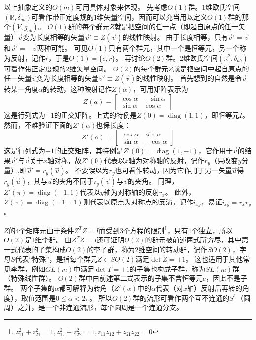 以上抽象定义的$O(m)$可用具体对象来体现。
先考虑$O(1)$群。$1$维欧氏空间$(\mathbb{R}, \delta_{ab})$可看作带正定度规的$1$维矢量空间，因而可以充当用以定义$O(1)$群的那个$(V, g_{ab})$。
$O(1)$群的每个群元$Z$就是把空间的任一点（即起自原点的任一矢量）$\vec v$变为长度相等的矢量$\vec v' \equiv Z(\vec v)$的线性映射。
由于长度相等，只有$\vec v' = \vec v$和$\vec v' = -\vec v$两种可能。
可见$O(1)$只有两个群元，其中一个是恒等元，另一个称为反射，记作$r$，于是$O(1) = \{e, r\}$。
再讨论$O(2)$群。$2$维欧氏空间$(\mathbb{R}^2, \delta_{ab})$可看作带正定度规的$2$维矢量空间。
$O(2)$的每个群元$Z$就是把空间中起自原点的任一矢量$\vec v$变为长度相等的矢量$\vec v' \equiv Z(\vec v)$的线性映射。
首先想到的自然是令$\vec v$转某一角度$\alpha$的转动，这种映射记作$Z(\alpha)$，可用矩阵表示为
$$Z(\alpha) = \begin{bmatrix}
    \cos \alpha & -\sin \alpha \\
    \sin \alpha & \cos \alpha
\end{bmatrix}$$
这是行列式为$+1$的正交矩阵。上式的特例是$Z(0) = \operatorname{diag}(1, 1)$，即恒等元$I$。
然而，不难验证下面的$Z'(\alpha)$也保长度：
$$Z'(\alpha) = \begin{bmatrix}
    \cos \alpha & \sin \alpha \\
    \sin \alpha & -\cos \alpha
\end{bmatrix}$$
这是行列式为$-1$的正交矩阵，其特例是$Z'(0) = \operatorname{diag}(1, -1)$，它作用于$\vec v$的结果$\vec v'$与$\vec v$关于$x$轴对称，故$Z'(0)$代表以$x$轴为对称轴的反射，记作$r_y$（只改变$y$分量）,即$\vec v' = r_y(\vec v)$。
不要误以为$r_y$也可看作转动，因为它作用于另一矢量$\vec u$得$r_y(\vec u)$，其与$\vec u$的夹角不同于$r_y(\vec v)$与$\vec v$的夹角。
同理，$Z'(\pi) = \operatorname{diag}(-1, 1)$代表以$y$轴为对称轴的反射$r_x$。
此外，$Z(\pi) = \operatorname{diag}(-1, -1)$则代表以原点为对称点的反演，记作$i_{xy}$，易证$i_{xy} = r_xr_y$。

$Z$的$4$个矩阵元由于条件$Z^TZ = I$而受到$3$个方程的限制\footnote{
    $z_{11}^2 + z_{21}^2 = 1, z_{12}^2 + z_{22}^2 = 1, z_{11}z_{12} + z_{21}z_{22} = 0$
}，只有$1$个独立，所以$O(2)$是$1$维李群。
由$Z^TZ = I$还可证明$O(2)$的群元被前述两式所穷尽，其中第一式代表的子集构成$O(2)$的李子群，称为$2$维空间的转动群，记作$SO(2)$，字母$S$代表``特殊''，是指每个群元$Z \in SO(2)$满足$\det Z = +1$。
这也适用于其他常见李群，例如$GL(m)$中满足$\det T = +1$的子集也构成子群，称为$SL(m)$群（特殊线性群）。
$O(2)$群中由前述第二式表示的子集不含恒等元$e$，因此不是子群。
两个子集的$\alpha$都可解释为转角（$Z'(\alpha)$中的$\alpha$代表（对$x$轴）反射后再转的角度），取值范围是$0 \leq \alpha < 2\pi$。
所以$O(2)$群的流形可看作两个互不连通的$S^1$（圆周）之并，是一个非连通流形，每个圆周是一个连通分支。

